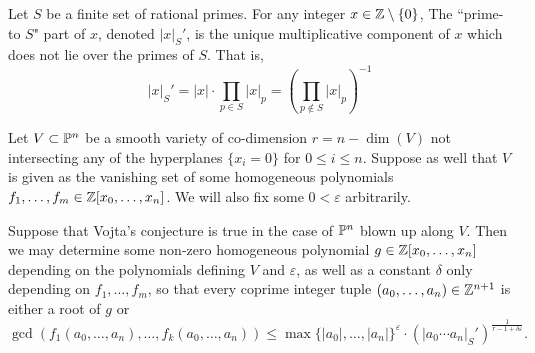 \begin{definition}
    Let $S$ be a finite set of rational primes. For any integer $x \in \mathbb{Z} \setminus \{ 0 \}$, The ``prime-to $S$" part of $x$, denoted $|x|_S'$, is the unique multiplicative component of $x$ which does not lie over the primes of $S$. That is,
    \[
        |x|_S' = |x| \cdot \prod_{p \in S} |x|_p = \left( \prod_{p \notin S} |x|_p \right)^{-1}
    \]
\end{definition}

\begin{theorem}
    Let $V \subset \mathbb{P}^n$ be a smooth variety of co-dimension $r = n - \dim(V)$ not intersecting any of the hyperplanes $\{x_i = 0\}$ for $0 \leq i \leq n$.
    Suppose as well that $V$ is given as the vanishing set of some homogeneous polynomials $f_1, \ldots, f_m \in \mathbb{Z}[x_0, \ldots, x_n]$.
    We will also fix some $0 < \varepsilon$ arbitrarily.

    Suppose that Vojta's conjecture is true in the case of $\mathbb{P}^n$ blown up along $V$.
    Then we may determine some non-zero homogeneous polynomial $g \in \mathbb{Z}[x_0, \ldots, x_n]$ depending on the polynomials defining $V$ and $\varepsilon$, as well as a constant $\delta$ only depending on $f_1, \ldots, f_m$, so that every coprime integer tuple $(a_0, \ldots, a_n) \in \mathbb{Z}^{n + 1}$ is either a root of $g$ or
    \[
        \gcd(f_1(a_0, \ldots, a_n), \ldots, f_k(a_0, \ldots, a_n))
            \leq \max\{|a_0|, \ldots, |a_n|\}^\varepsilon
                \cdot (|a_0 \cdots a_n|_S')^{\frac{1}{r - 1 + \delta \varepsilon}}.
    \]
    
\end{theorem}

